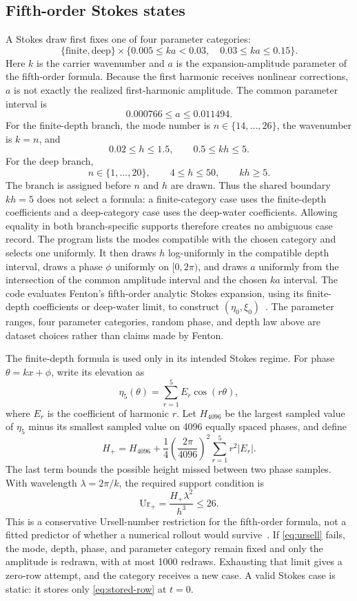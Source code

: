 \documentclass[10pt]{article}
\begin{document}
\subsection{Fifth-order Stokes states}

A Stokes draw first fixes one of four parameter categories:
\[
  \{\text{finite},\text{deep}\}
  \times
  \{0.005\leq ka<0.03,\quad 0.03\leq ka\leq0.15\}.
\]
Here $k$ is the carrier wavenumber and $a$ is the expansion-amplitude
parameter of the fifth-order formula.  Because the first harmonic receives
nonlinear corrections, $a$ is not exactly the realized first-harmonic
amplitude.  The common parameter interval is
\[
  0.000766\leq a\leq0.011494.
\]
For the finite-depth branch, the mode number is
$n\in\{14,\ldots,26\}$, the wavenumber is $k=n$, and
\[
  0.02\leq h\leq1.5,\qquad 0.5\leq kh\leq5.
\]
For the deep branch,
\[
  n\in\{1,\ldots,20\},\qquad 4\leq h\leq50,\qquad kh\geq5.
\]
The branch is assigned before \(n\) and \(h\) are drawn.  Thus the shared
boundary \(kh=5\) does not select a formula: a finite-category case uses the
finite-depth coefficients and a deep-category case uses the deep-water
coefficients.  Allowing equality in both branch-specific supports therefore
creates no ambiguous case record.
The program lists the modes compatible with the chosen category and selects one
uniformly.  It then draws $h$ log-uniformly in the compatible depth interval,
draws a phase $\phi$ uniformly on $[0,2\pi)$, and draws $a$ uniformly from the
intersection of the common amplitude interval and the chosen $ka$ interval.
The code evaluates Fenton's fifth-order analytic Stokes expansion, using its
finite-depth coefficients or deep-water limit, to construct
$(\eta_0,\xi_0)$~\cite{fenton1985}.  The parameter ranges, four parameter
categories, random phase, and depth law above are dataset choices rather than
claims made by Fenton.

The finite-depth formula is used only in its intended Stokes regime.  For
phase $\theta=kx+\phi$, write its elevation as
\[
  \eta_5(\theta)=\sum_{r=1}^{5}E_r\cos(r\theta),
\]
where $E_r$ is the coefficient of harmonic $r$.  Let $H_{4096}$ be the
largest sampled value of $\eta_5$ minus its smallest sampled value on 4096
equally spaced phases, and define
\[
  H_+
  =
  H_{4096}
  +\frac14\left(\frac{2\pi}{4096}\right)^2
    \sum_{r=1}^{5}r^2|E_r|.
\]
The last term bounds the possible height missed between two phase samples.
With wavelength $\lambda=2\pi/k$, the required support condition is
\begin{equation}
  \mathrm{Ur}_+
  =\frac{H_+\lambda^2}{h^3}
  \leq26.
  \label{eq:ursell}
\end{equation}
This is a conservative Ursell-number restriction for the fifth-order
formula, not a fitted predictor of whether a numerical rollout would
survive~\cite{fenton1985,zhao2024}.  If \eqref{eq:ursell} fails, the mode,
depth, phase, and parameter category remain fixed and only the amplitude is
redrawn, with at most 1000 redraws.  Exhausting that limit gives a zero-row
attempt, and the category receives a new case.  A valid Stokes case is static:
it stores only \eqref{eq:stored-row} at $t=0$.
\end{document}
